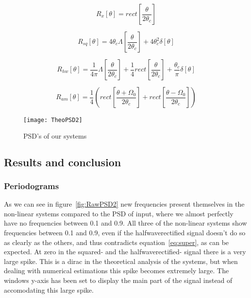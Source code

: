 \documentclass[10pt]{article}
\begin{document}
\begin{equation}
  \label{eq:PSDfiltsig}
   R_x[\theta] = rect[\frac{\theta} {2\theta_c}]
\end{equation}

\begin{equation}
  \label{eq:PSDsq}
  R_{sq}[\theta] = 4\theta_c\Lambda[\frac{\theta}{2\theta_c}]+4\theta_c^2\delta[\theta]
\end{equation}

\begin{equation}
  \label{eq:PSDhw}
 R_{hw}[\theta] = \frac{1}{4\pi}\Lambda[\frac{\theta}{2\theta_c}]+\frac{1}{4}rect[\frac{\theta} {2\theta_c}]
+\frac{\theta_c}{\pi}\delta[\theta]
\end{equation}

\begin{equation}
  \label{eq:PSDam}
  R_{am}[\theta] = \frac{1}{4}(rect[\frac{\theta+\Omega_{0}} {2\theta_c}]+rect[\frac{\theta-\Omega_{0}} {2\theta_c}])
\end{equation}

\begin{figure}[!hp]

    \begin{center}
      \texttt{[image: TheoPSD2]}
    \caption{PSD's of our systems \label{fig:theoPSD2}}
    \end{center}

\end{figure}

\subsection{Results and conclusion}

\subsubsection{Periodograms}
As we can see in figure~\ref{fig:RawPSD2} new frequencies present themselves in
the non-linear systems compared to the PSD of input, where we almost perfectly
have no frequencies between 0.1 and 0.9. All three of the non-linear systems show
frequencies between 0.1 and 0.9, even if the halfwaverectified signal doesn't do
so as clearly as the others, and thus contradicts equation~\ref{eq:super}, as can
be expected. At zero in the squared- and the halfwaverectified-
signal there is a very large spike. This is a dirac in the theoretical analysis
of the systems, but when dealing with numerical estimations this spike becomes
extremely large. The windows y-axis has been set to display the main part of the
signal instead of accomodating this large spike.
\end{document}
